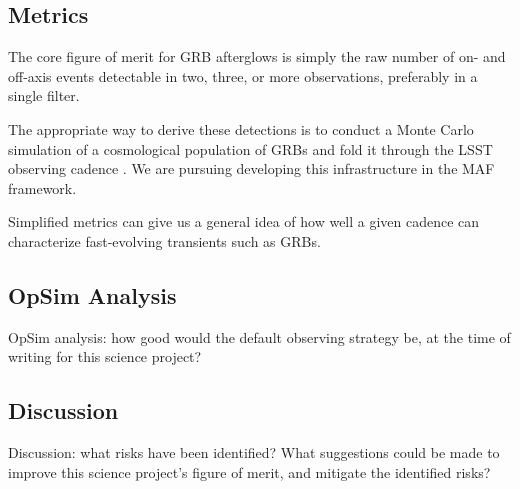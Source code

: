 
\subsection{Metrics}
\label{sec:keyword:metrics}

The core figure of merit for GRB afterglows is simply the raw number of on- and off-axis events detectable in two, three, or more observations, preferably in a single filter.

The appropriate way to derive these detections is to conduct a Monte Carlo simulation of a cosmological population of GRBs and fold it through the LSST observing cadence \citep[cf.][]{2011PASP..123.1034J}.  We are pursuing developing this infrastructure in the MAF framework.  

Simplified metrics can give us a general idea of how well a given cadence can characterize fast-evolving transients such as GRBs.



\subsection{OpSim Analysis}
\label{sec:keyword:analysis}

OpSim analysis: how good would the default observing strategy be, at
the time of writing for this science project?



\subsection{Discussion}
\label{sec:keyword:discussion}

Discussion: what risks have been identified? What suggestions could be
made to improve this science project's figure of merit, and mitigate
the identified risks?



\navigationbar
